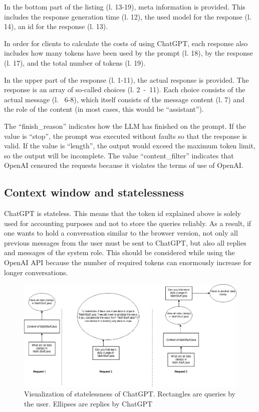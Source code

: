 In the bottom part of the listing (l. 13-19), meta information is provided. This includes the response generation time (l. 12), the used model for the response (l. 14), an id for the response (l. 13).

In order for clients to calculate the costs of using ChatGPT, each response also includes how many tokens have been used by the prompt (l. 18), by the response (l. 17), and the total number of tokens (l. 19).

In the upper part of the response (l. 1-11), the actual response is provided. The response is an array of so-called choices (l. 2~-~11). Each choice consists of the actual message (l.~ 6-8), which itself consists of the message content (l. 7) and the role of the content (in most cases, this would be \enquote{assistant}).

The \enquote{finish\_reason} indicates how the \ac{LLM} has finished on the prompt. If the value is \enquote{stop}, the prompt was executed without faults so that the response is valid. If the value is \enquote{length}, the output would exceed the maximum token limit, so the output will be incomplete. The value \enquote{content\_filter} indicates that OpenAI censured the requests because it violates the terms of use of OpenAI. \cite{ChatGPT_url}
\subsection{Context window and statelessness}

ChatGPT is stateless. This means that the token id explained above is solely used for accounting purposes and not to store the queries reliably. As a result, if one wants to hold a conversation similar to the browser version,  not only all previous messages from the user must be sent to ChatGPT, but also all replies and messages of the system role. This should be considered while using the OpenAI \ac{API} because the number of required tokens can enormously increase for longer conversations.

\begin{figure}
    \centering
    \includegraphics[width=\columnwidth]{figures/chapter2/chatgpt_stateless.png}
    \caption{Visualization of statelessness of ChatGPT. Rectangles are queries by the user. Ellipses are replies by ChatGPT}
    \label{fig:chatgpt_stateless}
\end{figure}


